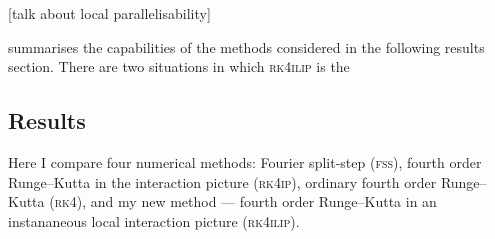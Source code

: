 [talk about local parallelisability]


 summarises the capabilities of the methods considered in the following results section. There are two situations in which \textsc{rk4ilip} is the

\subsection{Results}


 Here I compare four numerical methods: Fourier split-step (\textsc{fss}), fourth order Runge--Kutta in the interaction picture (\textsc{rk4ip}), ordinary fourth order Runge--Kutta (\textsc{rk4}), and my new method --- fourth order Runge--Kutta in an instananeous local interaction picture (\textsc{rk4ilip}).

